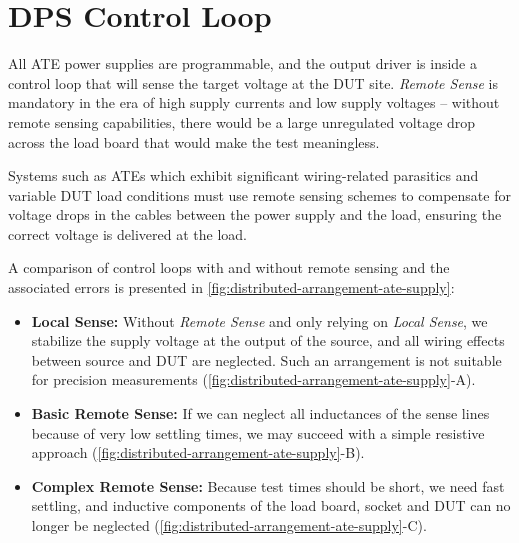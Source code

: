 

\section{\acs{DPS} Control Loop}
\label{sub:dps-control-loop}

All \ac{ATE} power supplies are programmable, and the output driver is inside a
control loop that will sense the target voltage at the \ac{DUT} site.
\emph{Remote Sense} is mandatory in the era of high supply currents and
low supply voltages – without remote sensing capabilities, there would be a
large unregulated voltage drop across the load board that would make the test
meaningless.

Systems such as \acp{ATE} which exhibit
significant wiring-related parasitics and variable \ac{DUT} load conditions must
use remote sensing schemes to compensate for voltage drops in the
cables between the power supply and the load, ensuring the correct voltage is
delivered at the load.

A comparison of control loops with and without remote sensing and the
associated errors is presented in
\autoref{fig:distributed-arrangement-ate-supply}:

\begin{itemize}[topsep=8pt,itemsep=4pt,partopsep=4pt, parsep=4pt]
    \item \textbf{Local Sense:}
    Without \emph{Remote Sense} and only relying on \emph{Local Sense}, we
    stabilize the supply voltage at the output of the source, and all wiring
    effects between source and \ac{DUT} are neglected.
    Such an arrangement is not suitable for precision measurements
    (\autoref{fig:distributed-arrangement-ate-supply}-A).

    \item \textbf{Basic Remote Sense:}
    If we can neglect all inductances of the sense lines because of very low
    settling times, we may succeed with a simple resistive approach
    (\autoref{fig:distributed-arrangement-ate-supply}-B).

    \item \textbf{Complex Remote Sense:}
    Because test times should be short, we need fast settling, and inductive
    components of the load board, socket and  \ac{DUT} can no longer be
    neglected (\autoref{fig:distributed-arrangement-ate-supply}-C).

\end{itemize}

